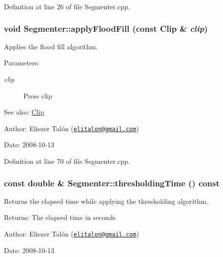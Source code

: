 Definition at line 26 of file Segmenter.cpp.\hypertarget{class_segmenter_327c88f2d55cb606a67ce778c06cf426}{
\subsubsection[applyFloodFill]{\setlength{\rightskip}{0pt plus 5cm}void Segmenter::applyFloodFill (const {\bf Clip} \& {\em clip})}}
\label{class_segmenter_327c88f2d55cb606a67ce778c06cf426}


Applies the flood fill algorithm. 

\begin{Desc}
\item[Parameters:]
\begin{description}
\item[{\em clip}]Press clip\end{description}
\end{Desc}
\begin{Desc}
\item[See also:]\hyperlink{class_clip}{Clip}\end{Desc}
\begin{Desc}
\item[Author:]Eliezer Talón (\href{mailto:elitalon@gmail.com}{\tt elitalon@gmail.com}) \end{Desc}
\begin{Desc}
\item[Date:]2008-10-13 \end{Desc}


Definition at line 70 of file Segmenter.cpp.\hypertarget{class_segmenter_52f771c61d667df4f552ee73dc9f22e7}{
\subsubsection[thresholdingTime]{\setlength{\rightskip}{0pt plus 5cm}const double \& Segmenter::thresholdingTime () const}}
\label{class_segmenter_52f771c61d667df4f552ee73dc9f22e7}


Returns the elapsed time while applying the thresholding algorithm. 

\begin{Desc}
\item[Returns:]The elapsed time in seconds\end{Desc}
\begin{Desc}
\item[Author:]Eliezer Talón (\href{mailto:elitalon@gmail.com}{\tt elitalon@gmail.com}) \end{Desc}
\begin{Desc}
\item[Date:]2008-10-13 \end{Desc}


